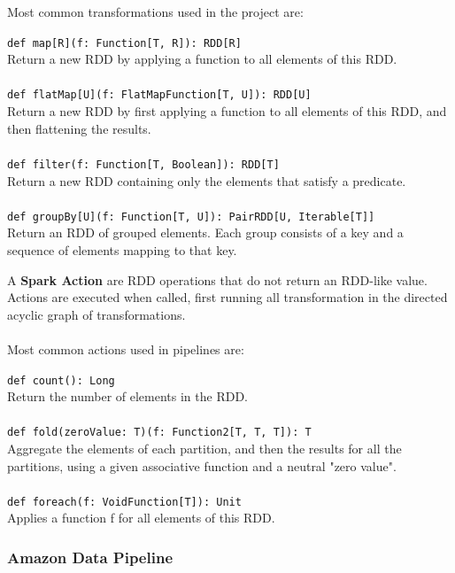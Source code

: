 Most common transformations used in the project are:

\begin{displayquote}
\texttt{def map[R](f: Function[T, R]): RDD[R]}
\\
Return a new RDD by applying a function to all elements of this RDD.
\\\\
\texttt{def flatMap[U](f: FlatMapFunction[T, U]): RDD[U]}
\\
Return a new RDD by first applying a function to all elements of this RDD, and then flattening the results.
\\\\
\texttt{def filter(f: Function[T, Boolean]): RDD[T]}
\\
Return a new RDD containing only the elements that satisfy a predicate.
\\\\
\texttt{def groupBy[U](f: Function[T, U]): PairRDD[U, Iterable[T]]}
\\
Return an RDD of grouped elements. Each group consists of a key and a sequence of elements mapping to that key.
\end{displayquote}

A \textbf{Spark Action} are RDD operations that do not return an RDD-like value. Actions are executed when called, first running all transformation in the directed acyclic graph of transformations.
\\\\
Most common actions used in pipelines are:

\begin{displayquote}
\texttt{def count(): Long}
\\
Return the number of elements in the RDD.
\\\\
\texttt{def fold(zeroValue: T)(f: Function2[T, T, T]): T}
\\
Aggregate the elements of each partition, and then the results for all the partitions, using a given associative function and a neutral "zero value".
\\\\
\texttt{def foreach(f: VoidFunction[T]): Unit}
\\
Applies a function f for all elements of this RDD.
\end{displayquote}

\subsubsection*{Amazon Data Pipeline} \label{data_pipeline}

